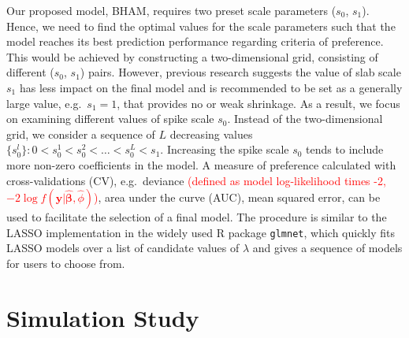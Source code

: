 \documentclass[AMA,STIX1COL,]{WileyNJD-v2}
\begin{document}
Our proposed model, BHAM, requires two preset scale parameters (\(s_0\),
\(s_1\)). Hence, we need to find the optimal values for the scale
parameters such that the model reaches its best prediction performance
regarding criteria of preference. This would be achieved by constructing
a two-dimensional grid, consisting of different (\(s_0\), \(s_1\))
pairs. However, previous research suggests the value of slab scale
\(s_1\) has less impact on the final model and is recommended to be set
as a generally large value, e.g.~\(s_1 = 1\), that provides no or weak
shrinkage. \citep{Rockova2018} As a result, we focus on examining
different values of spike scale \(s_0\). Instead of the two-dimensional
grid, we consider a sequence of \(L\) decreasing values
\(\{s_0^l\}: 0 < s_0^1 < s_0^2 < \dots < s_0^L < s_1\). Increasing the
spike scale \(s_0\) tends to include more non-zero coefficients in the
model. A measure of preference calculated with cross-validations (CV),
e.g.~deviance
\textcolor{red}{(defined as model log-likelihood times -2, $-2\log f(\boldsymbol{y}|\boldsymbol{\hat\beta}, \hat\phi)$)},
area under the curve (AUC), mean squared error, can be used to
facilitate the selection of a final model. The procedure is similar to
the LASSO implementation in the widely used R package \texttt{glmnet},
which quickly fits LASSO models over a list of candidate values of
\(\lambda\) and gives a sequence of models for users to choose from.

\section{Simulation Study}
\label{sec:sim}
\end{document}
